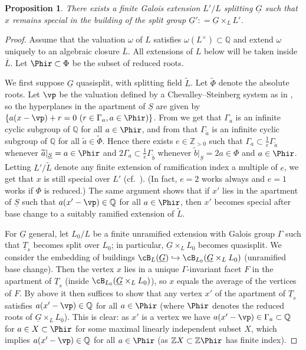\documentclass[a4paper]{amsart}
\numberwithin{equation}{section}
\newtheorem{prop}[thm]{Proposition}
\theoremstyle{remark}
\theoremstyle{definition}
\newcommand{\Z}{\mathbb{Z}}
\newcommand{\Q}{\mathbb{Q}}
\newcommand{\alggrp}[1]{\underline{#1}}
\newcommand{\into}{\hookrightarrow}
\renewcommand{\o}[1]{\overline{#1}}
\newcommand{\wt}[1]{\widetilde{#1}}
\begin{document}
\begin{prop}\label{prop:special-point-base-change}
  There exists a finite Galois extension $L'/L$ splitting $\alggrp G$ such that $x$ remains special in the building of
  the split group $\alggrp G' : = \alggrp G \times_{L} L'$.
\end{prop}

\begin{proof}
  Assume that the valuation $\omega$ of $L$ satisfies $\omega(L^\times) \subset \Q$ and extend $\omega$ uniquely to an algebraic closure $\o L$. 
  All extensions of $L$ below will be taken inside $\o L$. Let $\Phir \subset \Phi$ be the subset of reduced roots.

  We first suppose $\alggrp G$ quasisplit, with splitting field $\wt L$. Let $\wt\Phi$ denote the absolute roots.
  Let $\vp$ be the valuation defined by a Chevalley--Steinberg system as in \cite[\S4]{BT2},
  so the hyperplanes in the apartment of $\alggrp S$ are given by $\{ a(x-\vp)+r = 0\ (r \in \Gamma_a, a \in \Phir) \}$.
  From \cite[4.2.21]{BT2} we get that $\Gamma_a$ is an infinite cyclic subgroup of $\Q$ for all $a \in \Phir$, and from \cite[4.2.1]{BT2} that 
  $\Gamma_{\wt a}$ is an infinite cyclic subgroup of $\Q$ for all $\wt a \in \wt\Phi$.
  Hence there exists $e \in \Z_{> 0}$ such that $\Gamma_a \subset \frac 1e \Gamma_{\wt a}$ whenever $\wt a|_{\alggrp S} = a \in \Phir$
  and $2 \Gamma_a \subset \frac 1e \Gamma_{\wt b}$ whenever $\wt b|_{\alggrp S} = 2a \in \Phi$ and $a \in \Phir$.
  Letting $L'/\wt L$ denote any finite extension of ramification index a multiple of $e$, we get that $x$ is still special over $L'$ (cf.\ \cite[4.2.24]{BT2}).
  (In fact, $e = 2$ works always and $e = 1$ works if $\Phi$ is reduced.)
  The same argument shows that if $x'$ lies in the apartment of $\alggrp S$ such that $a(x'-\vp) \in \Q$ for all $a \in \Phir$,
  then $x'$ becomes special after base change to a suitably ramified extension of $\wt L$.

  For $\alggrp G$ general, 
  let $L_0/L$ be a finite unramified extension with Galois group $\Gamma$ such that $\alggrp T_s$ becomes split over $L_0$; in particular,
  $\alggrp G \times_L L_0$ becomes quasisplit.
  We consider the embedding of buildings $\cB_L(\alggrp G) \into \cB_{L_0}(\alggrp G \times_L L_0)$ (unramified base change).
  Then the vertex $x$ lies in a unique $\Gamma$-invariant facet $F$ in the apartment of $\alggrp T_s$ (inside $\cB_{L_0}(\alggrp G \times_L L_0)$), so $x$ equals the average of the vertices of $F$.
  By above it then suffices to show that any vertex $x'$ of the apartment of $\alggrp T_s$ satisfies $a(x'-\vp) \in \Q$ for all $a \in \Phir$
  (where $\Phir$ denotes the reduced roots of $\alggrp G \times_L L_0$). 
  This is clear: as $x'$ is a vertex we have $a(x'-\vp) \in \Gamma_a \subset \Q$ for $a \in X \subset \Phir$ for some maximal linearly independent subset $X$, 
  which implies $a(x'-\vp) \in \Q$ for all $a \in \Phir$ (as $\Z X \subset \Z \Phir$ has finite index).
\end{proof}
\end{document}
